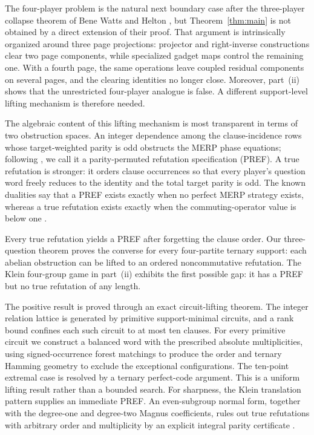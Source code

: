 \documentclass[11pt]{article}
\theoremstyle{definition}
\theoremstyle{remark}
\numberwithin{equation}{section}
\begin{document}
The four-player problem is the natural next boundary case after the
three-player collapse theorem of Bene Watts and Helton
\cite{WattsHelton2023}, but Theorem~\ref{thm:main} is not obtained by a
direct extension of their proof.  That argument is intrinsically organized
around three page projections: projector and right-inverse constructions
clear two page components, while specialized gadget maps control the
remaining one.  With a fourth page, the same operations leave coupled
residual components on several pages, and the clearing identities no longer
close.  Moreover, part~(ii) shows that the unrestricted four-player analogue
is false. A different support-level lifting mechanism is therefore needed.

The algebraic content of this lifting mechanism is most transparent in terms
of two obstruction spaces.  An integer dependence
among the clause-incidence rows whose target-weighted parity is odd obstructs
the MERP phase equations; following
\cite{WattsHarrowKanwarNatarajan2019}, we call it a parity-permuted refutation
specification (PREF).  A true refutation is stronger: it orders clause
occurrences so that every player's question word freely reduces to the
identity and the total target parity is odd.  The known dualities say that a
PREF exists exactly when no perfect MERP strategy exists, whereas a true
refutation exists exactly when the commuting-operator value is below one
\cite{WattsHarrowKanwarNatarajan2019,WattsHelton2023,WattsHeltonKlep2023}.

Every true refutation yields a PREF after forgetting the clause order.  Our
three-question theorem proves the converse for every four-partite ternary
support: each abelian obstruction can be lifted to an ordered
noncommutative refutation.  The Klein four-group game in part~(ii) exhibits
the first possible gap: it has a PREF but no true refutation of any length.

The positive result is proved through an exact circuit-lifting theorem.  The
integer relation lattice is generated by primitive support-minimal circuits,
and a rank bound confines each such circuit to at most ten clauses.  For every
primitive circuit we construct a balanced word with the prescribed absolute
multiplicities, using signed-occurrence forest matchings to produce the order
and ternary Hamming geometry to exclude the exceptional configurations.  The
ten-point extremal case is resolved by a ternary perfect-code argument.  This
is a uniform lifting result rather than a bounded search.  For sharpness, the
Klein translation pattern supplies an immediate PREF.  An even-subgroup normal
form, together with the degree-one and degree-two Magnus coefficients, rules
out true refutations with arbitrary order and multiplicity by an explicit
integral parity certificate \cite{Magnus1937,MagnusKarrassSolitar1976}.
\end{document}
